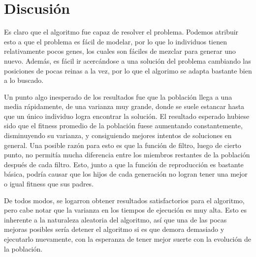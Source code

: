 \documentclass[letterpaper,11pt]{article} %
\begin{document}
\begin{figure}[H]
    \hfill

  \end{figure}

\section*{Discusión}
  Es claro que el algoritmo fue capaz de resolver el problema. Podemos atribuir esto a que el problema es fácil de modelar, por lo que lo individuos tienen relativamente pocos genes, los cuales son fáciles de mezclar para generar uno nuevo. Además, es fácil ir acercándose a una solución del problema cambiando las posiciones de pocas reinas a la vez, por lo que el algorimo se adapta bastante bien a lo buscado. 
  
  Un punto algo inesperado de los resultados fue que la población llega a una media rápidamente, de una varianza muy grande, donde se suele estancar hasta que un único individuo logra encontrar la solución. El resultado esperado hubiese sido que el fitness promedio de la población fuese aumentando constantemente, disminuyendo su varianza, y consiguiendo mejores intentos de soluciones en general. Una posible razón para esto es que la función de filtro, luego de cierto punto, no permitía mucha diferencia entre los miembros restantes de la población después de cada filtro. Esto, junto a que la función de reproducción es bastante básica, podría causar que los hijos de cada generación no logran tener una mejor o igual fitness que sus padres.

  De todos modos, se logarron obtener resultados satisfactorios para el algoritmo, pero cabe notar que la varianza en los tiempos de ejecución es muy alta. Esto es inherente a la naturaleza aleatoria del algoritmo, así que una de las pocas mejoras posibles sería detener el algoritmo si es que demora demasiado y ejecutarlo nuevamente, con la esperanza de tener mejor suerte con la evolución de la población. 

\end{document}
